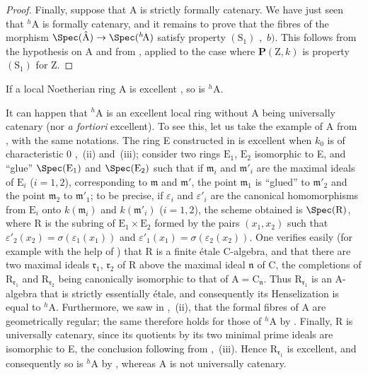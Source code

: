 \begin{proof}

Finally, suppose that A is strictly formally catenary.  We have just seen that ${}^h\!\mathrm{A}$ is formally catenary, and it remains to prove that the fibres of the morphism $\Spec(\hat{\mathrm{A}})\to\Spec({}^h\!\mathrm{A})$ satisfy property $(\mathrm{S}_1)$ ,~$b)$.  This follows from the hypothesis on A and from , applied to the case where $\boldsymbol{P}(\mathrm{Z},k)$ is property $(\mathrm{S}_1)$ for Z.
\end{proof}

\begin{corollary}[18.7.6]
\label{IV.18.7.6}
If a local Noetherian ring A is excellent , so is ${}^h\!\mathrm{A}$.
\end{corollary}

\begin{remark}[18.7.7]
\label{IV.18.7.7}
It can happen that ${}^h\!\mathrm{A}$ is an excellent local ring without A being universally catenary (nor \emph{a fortiori} excellent).
To see this, let us take the example of A from , with the same notations.
The ring E constructed in  is excellent when $k_0$ is of characteristic 0 ,~(ii) and~(iii);
consider two rings $\mathrm{E}_1$, $\mathrm{E}_2$ isomorphic to E, and ``glue'' $\Spec(\mathrm{E}_1)$ and $\Spec(\mathrm{E}_2)$ such that if $\mathfrak{m}_i$ and $\mathfrak{m}'_i$ are the maximal ideals of $\mathrm{E}_i$ ($i=1,2$), corresponding to $\mathfrak{m}$ and $\mathfrak{m}'$, the point $\mathfrak{m}_1$ is ``glued'' to $\mathfrak{m}'_2$ and the point $\mathfrak{m}_2$ to $\mathfrak{m}'_1$;
to be precise, if $\varepsilon_i$ and $\varepsilon'_i$ are the canonical homomorphisms from $\mathrm{E}_i$ onto $k(\mathfrak{m}_i)$ and $k(\mathfrak{m}'_i)$ ($i=1,2$), the scheme obtained is $\Spec(\mathrm{R})$, where R is the subring of $\mathrm{E}_1\times\mathrm{E}_2$ formed by the pairs $(x_1,x_2)$ such that $\varepsilon'_2(x_2)=\sigma(\varepsilon_1(x_1))$ and $\varepsilon'_1(x_1)=\sigma(\varepsilon_2(x_2))$.
One verifies easily (for example with the help of ) that R is a finite \'{e}tale C-algebra, and that there are two maximal ideals $\mathfrak{r}_1$, $\mathfrak{r}_2$ of R above the maximal ideal $\mathfrak{n}$ of C, the completions of $\mathrm{R}_{\mathfrak{r}_1}$ and $\mathrm{R}_{\mathfrak{r}_2}$ being canonically isomorphic to that of $\mathrm{A}=\mathrm{C}_{\mathfrak{n}}$.  Thus $\mathrm{R}_{\mathfrak{r}_1}$ is an A-algebra that is strictly essentially \'{e}tale, and consequently its Henselization is equal to ${}^h\!\mathrm{A}$.
Furthermore, we saw in ,~(ii), that the formal fibres of A are geometrically regular; the same therefore holds for those of ${}^h\!\mathrm{A}$ by .  Finally, R is universally catenary, since its quotients by its two minimal prime ideals are isomorphic to E, the conclusion following from ,~(iii).  Hence $\mathrm{R}_{\mathfrak{r}_1}$ is excellent, and consequently so is ${}^h\!\mathrm{A}$ by , whereas A is not universally catenary.
\end{remark}


